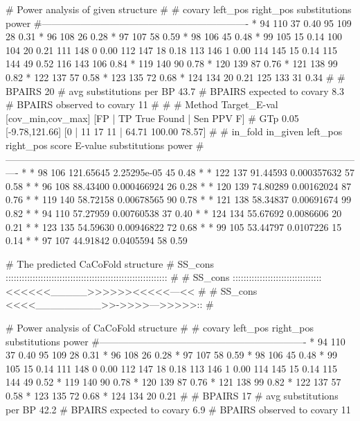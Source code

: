 \begin{sreoutput}
# Power analysis of given structure 
#
# covary  left_pos      right_pos    substitutions      power
#----------------------------------------------------------------
     *    94		110		37		0.40
          95		109		28		0.31
     *    96		108		26		0.28
     *    97		107		58		0.59
     *    98		106		45		0.48
     *    99		105		15		0.14
          100		104		20		0.21
          111		148		0		0.00
          112		147		18		0.18
          113		146		1		0.00
          114		145		15		0.14
          115		144		49		0.52
          116		143		106		0.84
     *    119		140		90		0.78
     *    120		139		87		0.76
     *    121		138		99		0.82
     *    122		137		57		0.58
     *    123		135		72		0.68
     *    124		134		20		0.21
          125		133		31		0.34
#
# BPAIRS 20
# avg substitutions per BP  43.7
# BPAIRS expected to covary 8.3
# BPAIRS observed to covary 11
#
#
# Method Target_E-val [cov_min,cov_max] [FP | TP True Found | Sen PPV F] 
# GTp    0.05         [-9.78,121.66]     [0 | 11 17 11 | 64.71 100.00 78.57] 
#
# in_fold in_given   left_pos       right_pos      score           E-value    substitutions      power
#----------------------------------------------------------------------------------------------------------------
*	*	        98	       106	121.65645	2.25295e-05	45		0.48
*	*	       122	       137	91.44593	0.000357632	57		0.58
*	*	        96	       108	88.43400	0.000466924	26		0.28
*	*	       120	       139	74.80289	0.00162024	87		0.76
*	*	       119	       140	58.72158	0.00678565	90		0.78
*	*	       121	       138	58.34837	0.00691674	99		0.82
*	*	        94	       110	57.27959	0.00760538	37		0.40
*	*	       124	       134	55.67692	0.0086606	20		0.21
*	*	       123	       135	54.59630	0.00946822	72		0.68
*	*	        99	       105	53.44797	0.0107226	15		0.14
*	*	        97	       107	44.91842	0.0405594	58		0.59

# The predicted CaCoFold structure
# SS_cons ::::::::::::::::::::::::::::::::::::::::::::::::::::::::::::
#
# SS_cons :::::::::::::::::::::::::::::::::<<<<<<_____>>>>>><<<<<---<<
#
# SS_cons <<<<_________>>->>>>--->>>>>::
#

# Power analysis of CaCoFold structure 
#
# covary  left_pos      right_pos    substitutions      power
#----------------------------------------------------------------
     *    94		110		37		0.40
          95		109		28		0.31
     *    96		108		26		0.28
     *    97		107		58		0.59
     *    98		106		45		0.48
     *    99		105		15		0.14
          111		148		0		0.00
          112		147		18		0.18
          113		146		1		0.00
          114		145		15		0.14
          115		144		49		0.52
     *    119		140		90		0.78
     *    120		139		87		0.76
     *    121		138		99		0.82
     *    122		137		57		0.58
     *    123		135		72		0.68
     *    124		134		20		0.21
#
# BPAIRS 17
# avg substitutions per BP  42.2
# BPAIRS expected to covary 6.9
# BPAIRS observed to covary 11
\end{sreoutput}


